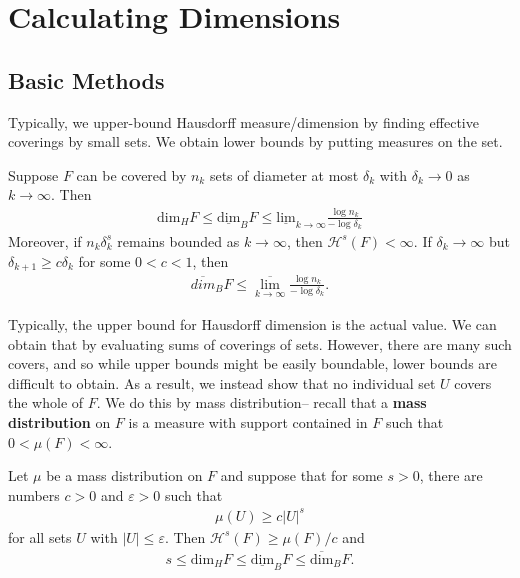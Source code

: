 \documentclass{memoir}
\begin{document}


\chapter{Calculating Dimensions}
\label{cha:calculating_dimensions}

\section{Basic Methods}
\label{sec:basic_methods}

Typically, we upper-bound Hausdorff measure/dimension by finding effective coverings by small sets. We obtain lower bounds by putting measures on the set.

\begin{prop}
	Suppose \(F\) can be covered by \(n_k\) sets of diameter at most \(\delta_k\) with \(\delta_k \to 0\) as \(k\to \infty\). Then
	\begin{align*}
		\textrm{dim}_H F \leq \underline{\textrm{dim}}_B F \leq \underline{\textrm{lim}}_{k\to \infty} \frac{\log n_k}{- \log \delta _k}
	\end{align*}
	Moreover, if \(n_k \delta ^{s}_k\) remains bounded as \(k\to \infty\), then \(\mathcal{H}^{s}(F)<\infty\). If \(\delta _k \to \infty\) but \(\delta _{k+1}\geq c \delta _k\) for some \(0<c<1\), then
	\begin{align*}
		\overline{dim}_B F \leq \overline{\lim_{k \to \infty} } \frac{\log n_k}{- \log \delta_k}.
	\end{align*}
\end{prop}
Typically, the upper bound for Hausdorff dimension is the actual value. We can obtain that by evaluating sums of coverings of sets. However, there are many such covers, and so while upper bounds might be easily boundable, lower bounds are difficult to obtain. As a result, we instead show that no individual set \(U\) covers the whole of \(F\). We do this by mass distribution-- recall that a \textbf{mass distribution} on \(F\) is a measure with support contained in \(F\) such that \(0 < \mu (F) < \infty\).

\begin{thm}
	Let \(\mu \) be a mass distribution on \(F\) and suppose that for some \(s>0\), there are numbers \(c>0\) and \(\varepsilon>0\) such that
	\begin{align*}
		\mu(U) \geq c \left| U \right|^{s}
	\end{align*}
	for all sets \(U\) with \(\left| U \right| \leq \varepsilon\). Then \(\mathcal{H}^{s}(F) \geq \mu (F) / c\) and
	\begin{align*}
		s \leq \textrm{dim}_H F \leq \underline{\textrm{dim}}_B F \leq \overline{\textrm{dim}}_B F.
	\end{align*}
\end{thm}
\end{document}
